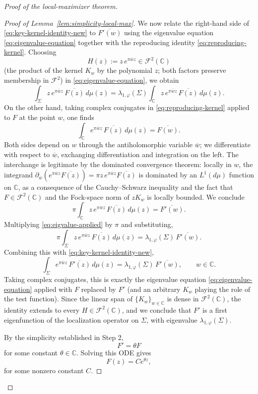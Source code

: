 \documentclass[a4paper,11pt,reqno]{amsart}
\numberwithin{equation}{section}
\theoremstyle{plain} %
\theoremstyle{definition} %
\theoremstyle{remark}
\newcommand{\C}{\mathbb{C}}
\begin{document}
\begin{proof}[Proof of the local-maximizer theorem]
\begin{proof}[Proof of Lemma~\ref{lem:simplicity-local-max}]
We now relate the right-hand side of \eqref{eq:key-kernel-identity-new} to
\(\overline{F'(w)}\) using the eigenvalue equation
\eqref{eq:eigenvalue-equation} together with the reproducing identity
\eqref{eq:reproducing-kernel}. Choosing
\[
H(z):=z\,e^{\pi\overline w z}\in \mathcal F^2(\C)
\]
(the product of the kernel \(K_w\) by the polynomial \(z\); both factors
preserve membership in \(\mathcal F^2\)) in \eqref{eq:eigenvalue-equation}, we
obtain
\begin{equation}\label{eq:eigvalue-applied}
\int_\Sigma z\, e^{\pi \overline wz}\,\overline{F(z)}\,d\mu(z)
=
\lambda_{1,\varphi}(\Sigma)\int_\C z\, e^{\pi \overline wz}\,\overline{F(z)}\,d\mu(z).
\end{equation}
On the other hand, taking complex conjugates in \eqref{eq:reproducing-kernel}
applied to \(F\) at the point \(w\), one finds
\[
\int_\C e^{\pi \overline wz}\,\overline{F(z)}\,d\mu(z)=\overline{F(w)}.
\]
Both sides depend on \(w\) through the antiholomorphic variable
\(\overline w\); we differentiate with respect to \(\overline w\), exchanging
differentiation and integration on the left. The interchange is legitimate by
the dominated convergence theorem: locally in \(w\), the integrand
\(\partial_{\overline w}(e^{\pi\overline wz}\overline{F(z)})
=\pi z\,e^{\pi\overline wz}\overline{F(z)}\) is dominated by an
\(L^1(d\mu)\) function on \(\C\), as a consequence of the Cauchy--Schwarz
inequality and the fact that \(F\in \mathcal F^2(\C)\) and the Fock-space norm
of \(zK_w\) is locally bounded. We conclude
\[
\pi\int_\C z\, e^{\pi \overline wz}\,\overline{F(z)}\,d\mu(z)
=
\overline{F'(w)}.
\]
Multiplying \eqref{eq:eigvalue-applied} by \(\pi\) and substituting,
\[
\pi\int_\Sigma z\, e^{\pi \overline wz}\,\overline{F(z)}\,d\mu(z)
=
\lambda_{1,\varphi}(\Sigma)\,\overline{F'(w)}.
\]
Combining this with \eqref{eq:key-kernel-identity-new},
\[
\int_\Sigma e^{\pi \overline wz}\,\overline{F'(z)}\,d\mu(z)
=
\lambda_{1,\varphi}(\Sigma)\,\overline{F'(w)},
\qquad w\in \C.
\]
Taking complex conjugates, this is exactly the eigenvalue equation
\eqref{eq:eigenvalue-equation} applied with \(F\) replaced by \(F'\) (and an
arbitrary \(K_w\) playing the role of the test function). Since the linear
span of \(\{K_w\}_{w\in\C}\) is dense in \(\mathcal F^2(\C)\), the identity
extends to every \(H\in\mathcal F^2(\C)\), and we conclude that \(F'\) is a
first eigenfunction of the localization operator on \(\Sigma\), with eigenvalue
\(\lambda_{1,\varphi}(\Sigma)\).

By the simplicity established in Step 2,
\[
F'=\theta F
\]
for some constant \(\theta\in \C\). Solving this ODE gives
\[
F(z)=C e^{\theta z},
\]
for some nonzero constant \(C\).


\end{proof}
\end{proof}
\end{document}
